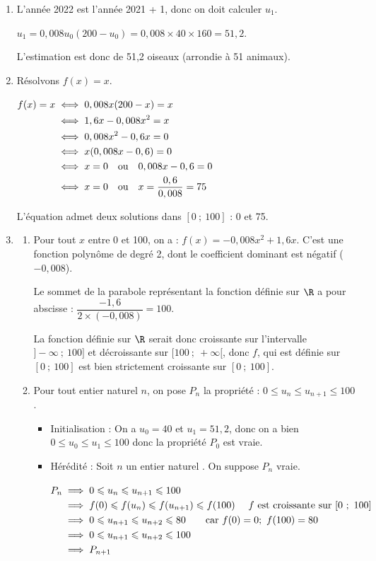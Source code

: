 
\medskip

\begin{enumerate}
\item L'année 2022 est l'année 2021 + 1, donc on doit calculer $u_1$.

$u_1 = 0,008u_0(200 - u_0) = 0,008\times 40 \times 160 = 51,2$.

L'estimation est donc de 51,2 oiseaux (arrondie à 51 animaux).

\item Résolvons $f(x) = x$.

$ \aligned[t] f(x) = x &\iff 0,008x(200 - x) = x \\
&\iff 1,6x - 0,008x^2 = x\\
&\iff 0,008x^2 - 0,6x = 0\\
&\iff x(0,008x - 0,6) = 0\\
&\iff x = 0 \quad \text{ou}\quad 0,008x - 0,6 = 0\\
&\iff x = 0 \quad \text{ou}\quad x = \dfrac{0,6}{0,008} =75
\endaligned$

L'équation admet deux solutions dans $ [0~;~100] $ : 0 et 75.

\item 
	\begin{enumerate}
		\item Pour tout $x$ entre 0 et 100, on a : $f(x) = -0,008x^2 + 1,6x$. C'est une fonction polynôme de degré 2, dont le coefficient dominant est négatif ($-0,008$).

Le sommet de la parabole représentant la fonction définie sur $\R$ a pour abscisse : $\dfrac{- 1,6}{2\times (- 0,008)} = 100$.

La fonction définie sur $\R$ serait donc croissante sur l'intervalle $]-\infty~;~100]$ et décroissante sur $[100~;~+\infty[$, donc $f$, qui est définie sur $[0~;~100]$ est bien strictement croissante sur $ [0~;~100] $.

		\item Pour tout entier naturel $n$, on pose $P_n$ la propriété : \og $0\leqslant u_n \leqslant u_{n+1} \leqslant 100$\fg{}.

\begin{itemize}
\item Initialisation : On a $u_0 = 40$ et $u_1 = 51,2$, donc on a bien $0 \leqslant u_0 \leqslant u_1 \leqslant 100$ donc la propriété $P_0$ est vraie.
\item Hérédité : Soit $n$ un entier naturel . On suppose $P_n$ vraie.

$ \aligned[t] P_n &\implies 0 \leqslant u_n \leqslant u_{n+1}\leqslant 100\\
&\implies f(0) \leqslant f(u_n)\leqslant f(u_{n+1}) \leqslant f(100) \quad \text{ $f$ est croissante sur }[0~;~100]\\
&\implies 0 \leqslant u_{n+1} \leqslant u_{n+2} \leqslant 80 \qquad \text{car }f(0) = 0 ; ~f(100) = 80 \\
&\implies 0 \leqslant u_{n+1} \leqslant u_{n+2} \leqslant 100 \\
&\implies P_{n+1}
\endaligned $


\end{itemize}
\end{enumerate}
\end{enumerate}
